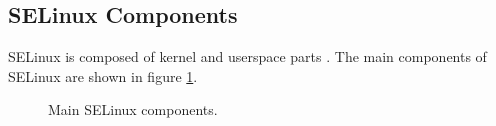 \subsection{SELinux Components}
SELinux is composed of kernel and userspace parts \cite[pp.~19--22]{tsn}. The
main components of SELinux are shown in figure \ref{fig:selinuxcomponents}.

\begin{figure}
    \centering
    \label{fig:selinuxcomponents}
    
    \caption{Main SELinux components.}
\end{figure}


